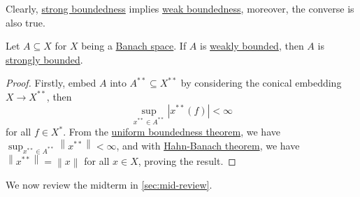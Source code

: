 Clearly, \hyperref[def:strongly-bounded]{strong boundedness} implies \hyperref[def:weakly-bounded]{weak boundedness}, moreover, the converse is also true.

\begin{corollary}\label{col:weak-bd-implies-strong-bd}
	Let \(A \subseteq X\) for \(X\) being a \hyperref[def:Banach-space]{Banach space}. If \(A\) is \hyperref[def:weakly-bounded]{weakly bounded}, then \(A\) is \hyperref[def:strongly-bounded]{strongly bounded}.
\end{corollary}
\begin{proof}
	Firstly, embed \(A\) into \(A^{\ast\ast} \subseteq X^{\ast\ast} \) by considering the conical embedding \(X\to X^{\ast\ast}\), then
	\[
		\sup _{x^{\ast\ast}\in A^{\ast\ast}} \left\vert x^{\ast\ast} (f) \right\vert < \infty
	\]
	for all \(f\in X^{\ast} \). From the \hyperref[thm:uniform-boundedness]{uniform boundedness theorem}, we have \(\sup _{x^{\ast\ast} \in A^{\ast\ast} }\left\lVert x^{\ast\ast} \right\rVert < \infty \), and with \hyperref[thm:Hahn-Banach]{Hahn-Banach theorem}, we have \(\left\lVert x^{\ast\ast} \right\rVert = \left\lVert x\right\rVert \) for all \(x\in X\), proving the result.
\end{proof}

We now review the midterm in \autoref{sec:mid-review}.